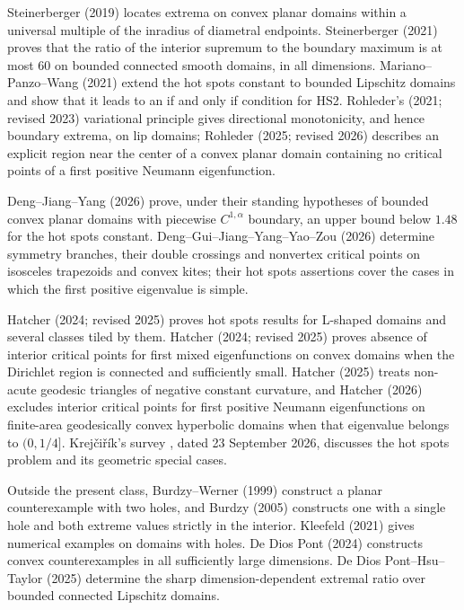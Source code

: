 \documentclass[11pt]{article}
\theoremstyle{definition}
\theoremstyle{remark}
\numberwithin{equation}{section}
\begin{document}
Steinerberger (2019) \cite{SteinerTips} locates extrema on convex planar domains within a universal multiple
of the inradius of diametral endpoints. Steinerberger (2021) \cite{SteinerConstant} proves that the ratio of
the interior supremum to the boundary maximum is at most $60$ on bounded connected smooth domains, in all
dimensions. Mariano--Panzo--Wang (2021) \cite{MPW} extend the hot spots constant to bounded Lipschitz domains
and show that it leads to an if and only if condition for HS2. Rohleder's (2021; revised 2023)
variational principle \cite{RohlederLip} gives directional monotonicity, and hence boundary extrema, on lip
domains; Rohleder (2025; revised 2026) \cite{RohlederCenter} describes an explicit region near the center of a convex planar
domain containing no critical points of a first positive Neumann eigenfunction.

Deng--Jiang--Yang (2026) \cite[Theorem~1.3(E)]{DJY} prove, under their standing hypotheses of bounded convex
planar domains with piecewise $C^{1,\alpha}$ boundary, an upper bound below $1.48$ for the hot spots constant.
Deng--Gui--Jiang--Yang--Yao--Zou (2026) \cite{DGGJYZ} determine symmetry branches, their double crossings and
nonvertex critical points on isosceles trapezoids and convex kites; their hot spots assertions cover the
cases in which the first positive eigenvalue is simple.

Hatcher (2024; revised 2025) \cite{HatcherPolygons} proves hot spots results for L-shaped domains and several classes tiled by
them. Hatcher (2024; revised 2025) \cite{HatcherMixed} proves absence of interior critical points for first mixed eigenfunctions
on convex domains when the Dirichlet region is connected and sufficiently small. Hatcher (2025)
\cite{HatcherCurvature} treats non-acute geodesic triangles of negative constant curvature, and Hatcher (2026)
\cite[Theorem~1.1]{HatcherHyperbolic} excludes interior critical points for first positive Neumann
eigenfunctions on finite-area geodesically convex hyperbolic domains when that eigenvalue belongs to
$(0,1/4]$. Krej\v ci\v r\'ik's survey \cite[Section~6.4]{Krejcirik}, dated 23 September 2026, discusses the
hot spots problem and its geometric special cases.

Outside the present class, Burdzy--Werner (1999) \cite{BW1999} construct a planar counterexample with two
holes, and Burdzy (2005) \cite{Burdzy2005} constructs one with a single hole and both extreme values strictly
in the interior. Kleefeld (2021) \cite{Kleefeld} gives numerical examples on domains with holes. De Dios Pont (2024)
\cite{deDios} constructs convex counterexamples in all sufficiently large dimensions.
De Dios Pont--Hsu--Taylor (2025) \cite[Definition~1 and Theorem~4]{DDHT} determine the sharp dimension-dependent
extremal ratio over bounded connected Lipschitz domains.
\end{document}
